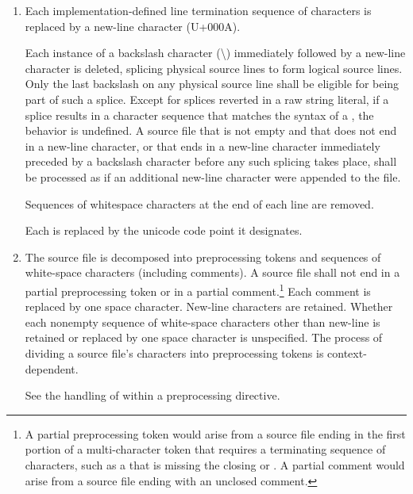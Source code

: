 \documentclass{wg21}
\begin{document}
\begin{enumerate}
\begin{addedblock}
\end{addedblock}
    \item
\begin{addedblock}
    Each implementation-defined line termination sequence of characters is replaced by a new-line character (U+000A).
\end{addedblock}
    Each instance of a backslash character (\textbackslash)
    immediately followed by a new-line character  is deleted, splicing
    physical source lines to form logical source lines. Only the last
    backslash on any physical source line shall be eligible for being part
    of such a splice.
    Except for splices reverted in a raw string literal, if a splice results in
    a character sequence that matches the
    syntax of a , the behavior is
    undefined. A source file that is not empty and that does not end in a new-line
    character, or that ends in a new-line character immediately preceded by a
    backslash character before any such splicing takes place,
    shall be processed as if an additional new-line character were appended
    to the file.
    
    
    \begin{addedblock}
    Sequences of whitespace characters at the end of each line are removed.
    
    Each  is replaced by the unicode code point it designates.
    \end{addedblock}

    \item The source file is decomposed into preprocessing
    tokens and sequences of white-space characters
    (including comments). A source file shall not end in a partial
    preprocessing token or in a partial comment.\footnote{A partial preprocessing
        token would arise from a source file
        ending in the first portion of a multi-character token that requires a
        terminating sequence of characters, such as a 
        that is missing the closing 
        or \tcode{>}. A partial comment
        would arise from a source file ending with an unclosed \tcode{/*}
        comment.}
    Each comment is replaced by one space character. New-line characters are
    retained. Whether each nonempty sequence of white-space characters other
    than new-line is retained or replaced by one space character is
    unspecified. The process of dividing a source file's
    characters into preprocessing tokens is context-dependent.
    \begin{example}
        See the handling of \tcode{<} within a  preprocessing
        directive.
    \end{example}


\end{enumerate}
\end{document}
